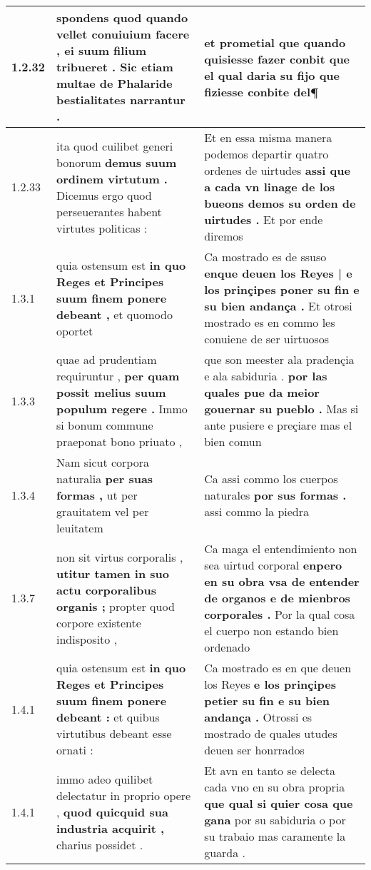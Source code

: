 \begin{tabular}{|p{1cm}|p{6.5cm}|p{6.5cm}|}
1.2.32 & spondens quod quando vellet conuiuium facere , \textbf{ ei suum filium tribueret . } Sic etiam multae de Phalaride bestialitates narrantur . & et prometial que quando quisiesse fazer conbit \textbf{ que el qual daria su fijo } que fiziesse conbite del¶ \\\hline
1.2.33 & ita quod cuilibet generi bonorum \textbf{ demus suum ordinem virtutum . } Dicemus ergo quod perseuerantes habent virtutes politicas : & Et en essa misma manera podemos departir quatro ordenes de uirtudes \textbf{ assi que a cada vn linage de los bueons demos su orden de uirtudes . } Et por ende diremos \\\hline
1.3.1 & quia ostensum est \textbf{ in quo Reges et Principes suum finem ponere debeant , } et quomodo oportet & Ca mostrado es de ssuso \textbf{ enque deuen los Reyes | e los prinçipes poner su fin e su bien andança . } Et otrosi mostrado es en commo les conuiene de ser uirtuosos \\\hline
1.3.3 & quae ad prudentiam requiruntur , \textbf{ per quam possit melius suum populum regere . } Immo si bonum commune praeponat bono priuato , & que son meester ala pradençia e ala sabiduria . \textbf{ por las quales pue da meior gouernar su pueblo . } Mas si ante pusiere e preçiare mas el bien comun \\\hline
1.3.4 & Nam sicut corpora naturalia \textbf{ per suas formas , } ut per grauitatem vel per leuitatem & Ca assi commo los cuerpos naturales \textbf{ por sus formas . } assi commo la piedra \\\hline
1.3.7 & non sit virtus corporalis , \textbf{ utitur tamen in suo actu corporalibus organis ; } propter quod corpore existente indisposito , & Ca maga el entendimiento non sea uirtud corporal \textbf{ enpero en su obra vsa de entender de organos e de mienbros corporales . } Por la qual cosa el cuerpo non estando bien ordenado \\\hline
1.4.1 & quia ostensum est \textbf{ in quo Reges et Principes suum finem ponere debeant : } et quibus virtutibus debeant esse ornati : & Ca mostrado es en que deuen los Reyes \textbf{ e los prinçipes petier su fin e su bien andança . } Otrossi es mostrado de quales utudes deuen ser honrrados \\\hline
1.4.1 & immo adeo quilibet delectatur in proprio opere , \textbf{ quod quicquid sua industria acquirit , } charius possidet . & Et avn en tanto se delecta cada vno en su obra propria \textbf{ que qual si quier cosa que gana } por su sabiduria o por su trabaio mas caramente la guarda . \\\hline

\end{tabular}
